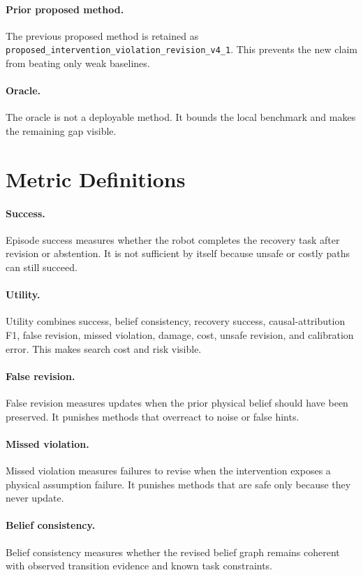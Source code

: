\documentclass{article}
\begin{document}
\paragraph{Prior proposed method.} The previous proposed method is retained as \texttt{proposed\_intervention\_violation\_revision\_v4\_1}. This prevents the new claim from beating only weak baselines.

\paragraph{Oracle.} The oracle is not a deployable method. It bounds the local benchmark and makes the remaining gap visible.

\clearpage
\section{Metric Definitions}
\paragraph{Success.} Episode success measures whether the robot completes the recovery task after revision or abstention. It is not sufficient by itself because unsafe or costly paths can still succeed.

\paragraph{Utility.} Utility combines success, belief consistency, recovery success, causal-attribution F1, false revision, missed violation, damage, cost, unsafe revision, and calibration error. This makes search cost and risk visible.

\paragraph{False revision.} False revision measures updates when the prior physical belief should have been preserved. It punishes methods that overreact to noise or false hints.

\paragraph{Missed violation.} Missed violation measures failures to revise when the intervention exposes a physical assumption failure. It punishes methods that are safe only because they never update.

\paragraph{Belief consistency.} Belief consistency measures whether the revised belief graph remains coherent with observed transition evidence and known task constraints.
\end{document}

